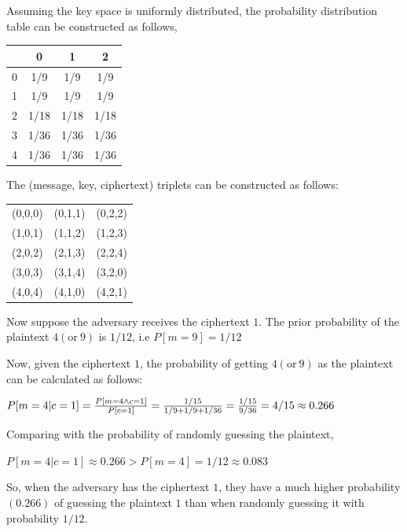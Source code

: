 \documentclass{ashoka-crypto}
\begin{document}
Assuming the key space is uniformly distributed, the probability distribution table can be constructed as follows,

\begin{table}[h]
\begin{tabular}{|c|ccc|}
\hline
  & 0    & 1    & 2    \\
  \hline
0 & 1/9  & 1/9  & 1/9  \\
1 & 1/9  & 1/9  & 1/9  \\
2 & 1/18 & 1/18 & 1/18 \\
3 & 1/36 & 1/36 & 1/36 \\
4 & 1/36 & 1/36 & 1/36\\
\hline
\end{tabular}
\centering
\end{table}

The (message, key, ciphertext) triplets can be constructed as follows:

\begin{table}[h]
\begin{tabular}{ccc}
(0,0,0)  & (0,1,1)  & (0,2,2)  \\
(1,0,1) & (1,1,2)  & (1,2,3)  \\
(2,0,2) & (2,1,3) & (2,2,4) \\
(3,0,3) & (3,1,4) & (3,2,0) \\
(4,0,4) & (4,1,0) & (4,2,1) \\
\end{tabular}
\centering
\end{table}

Now suppose the adversary receives the ciphertext $1$. The prior probability of the plaintext $4 (\text{or} \> 9)$ is $1/12$, i.e $P[m = 9] = 1/12$

Now, given the ciphertext $1$, the probability of getting $4 (\text{or} \> 9)$ as the plaintext can be calculated as follows:

\begin{math}
P[m=4|c=1] = \frac{P[m=4\land c=1]}{P[c=1]} = \frac{1/15}{1/9 + 1/9 + 1/36} = \frac{1/15}{9/36} = 4/15 \approx 0.266 \\
\end{math}

Comparing with the probability of randomly guessing the plaintext,

\begin{math}
P[m=4|c=1] \approx 0.266 > P[m = 4] = 1/12 \approx 0.083
\end{math}

So, when the adversary has the ciphertext $1$, they have a much higher probability $(0.266)$ of guessing the plaintext $1$ than when randomly guessing it with probability $1/12$.
\end{document}
